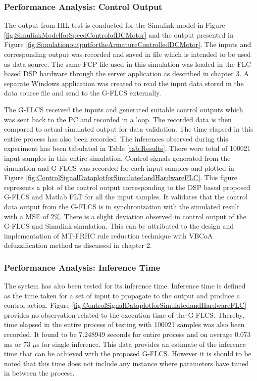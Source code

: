 \subsubsection{Performance Analysis: Control Output} \label{sec:ContPerf}

The output from HIL test is conducted for the Simulink model in Figure \ref{fig:SimulinkModelforSpeedControlofDCMotor} and the output presented in Figure \ref{fig:SimulationoutputfortheArmatureControlledDCMotor}. The inputs and corresponding output was recorded and saved in file which is intended to be used as data source. The same FCP file used in this simulation was loaded in the FLC based DSP hardware through the server application as described in chapter 3. A separate Windows application was created to read the input data stored in the data source file and send to the G\hyp{}FLCS externally. 
\par		
The G\hyp{}FLCS received the inputs and generated suitable control outputs which was sent back to the PC and recorded in a loop. The recorded data is then compared to actual simulated output for data validation. The time elapsed in this entire process has also been recorded. The inferences observed during this experiment has been tabulated in Table \ref{tab:Results}.
There were total of 100021 input samples in this entire simulation. Control signals generated from the simulation and G\hyp{}FLCS was recorded for each input samples and plotted in Figure \ref{fig:ControlSignalDataplotforSimulatedandHardwareFLC}. This figure represents a plot of the control output corresponding to the DSP based proposed G-FLCS and Matlab FLT for all the input samples. It validates that the control data output from the G\hyp{}FLCS is in synchronization with the simulated result with a MSE of 2\%. There is a slight deviation observed in control output of the G\hyp{}FLCS and Simulink simulation. This can be attributed to the design and implementation of MT-FRHC rule reduction technique with VBCoA defuzzification method as discussed in chapter 2. 

\subsubsection{Performance Analysis: Inference Time}
\par
The system has also been tested for its inference time. Inference time is defined as the time taken for a set of input to propagate to the output and produce a control action. Figure \ref{fig:ControlSignalDataplotforSimulatedandHardwareFLC} provides no observation related to the execution time of the G\hyp{}FLCS. Thereby, time elapsed in the entire process of testing with 100021 samples was also been recorded. It found to be 7.248949 seconds for entire process and on average 0.073 ms or 73 $\mu$s for single inference. This data provides an estimate of the inference time that can be achieved with the proposed G\hyp{}FLCS. However it is should to be noted that this time does not include any instance where parameters have tuned in between the process. 

